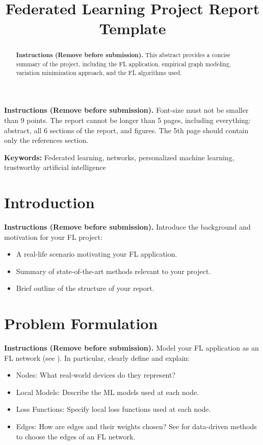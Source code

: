 \documentclass[9pt]{article}
\title{Federated Learning Project Report Template}
\begin{document}
	\maketitle
	{\bf Instructions (Remove before submission).} Font-size must not be smaller than 9 points. The report cannot be longer 
	than 5 pages, including everything: abstract, all 6 sections of the report, and figures. 
	The 5th page should contain only the references section.
	\begin{abstract}
		{\bf Instructions (Remove before submission).} This abstract provides a concise summary of the project, including the FL 
		application, empirical graph modeling, variation minimization approach, and 
		the FL algorithms used.
	\end{abstract}
	
	\textbf{Keywords:} Federated learning, networks, personalized machine learning, trustworthy artificial intelligence
	
	\section{Introduction}
	\label{sec:intro}
	{\bf Instructions (Remove before submission).}
		Introduce the background and motivation for your FL project:
		\begin{itemize}
			\item A real-life scenario motivating your FL application.
			\item Summary of state-of-the-art methods relevant to your project.
			\item Brief outline of the structure of your report.
		\end{itemize}
	
	\section{Problem Formulation}
	\label{sec:pf}
	{\bf Instructions (Remove before submission).}
		Model your FL application as an FL network (see \cite[Ch.~3]{Jung2025}). 
		In particular, clearly define and explain:
		\begin{itemize}
			\item Nodes: What real-world devices do they represent?
			\item Local Models: Describe the ML models used at each node.
			\item Loss Functions: Specify local loss functions used at each node.
			\item Edges: How are edges and their weights chosen? See \cite[Ch. 7]{Jung2025} for 
			data-driven methods to choose the edges of an FL network. 
		\end{itemize}
	
\end{document}
